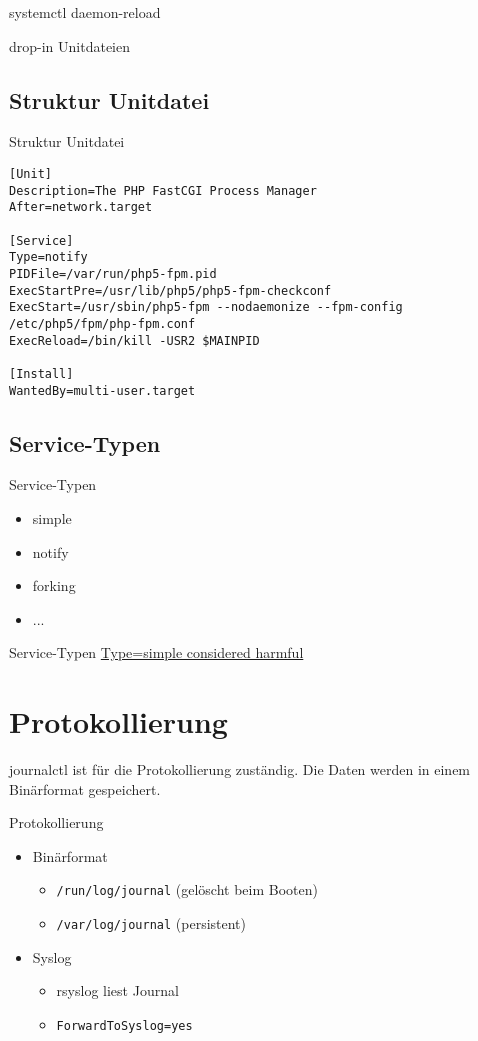  systemctl daemon-reload

 drop-in Unitdateien
 \subsection{Struktur Unitdatei}

\begin{frame}[fragile]{Struktur Unitdatei}
 \begin{lstlisting}
[Unit]
Description=The PHP FastCGI Process Manager
After=network.target

[Service]
Type=notify
PIDFile=/var/run/php5-fpm.pid
ExecStartPre=/usr/lib/php5/php5-fpm-checkconf
ExecStart=/usr/sbin/php5-fpm --nodaemonize --fpm-config /etc/php5/fpm/php-fpm.conf
ExecReload=/bin/kill -USR2 $MAINPID

[Install]
WantedBy=multi-user.target
\end{lstlisting}
\end{frame}

\subsection{Service-Typen}

\begin{frame}{Service-Typen}
\begin{itemize}
\item simple
\item notify
\item forking
\item ...
\end{itemize}
\end{frame}

\begin{frame}{Service-Typen}
\href{https://www.lucas-nussbaum.net/blog/?p=877}{Type=simple considered harmful}
\end{frame}

\section{Protokollierung}

journalctl ist für die Protokollierung zuständig. Die Daten werden in einem Binärformat gespeichert.

\begin{frame}[fragile]{Protokollierung}
\begin{itemize}
\item Binärformat
\begin{itemize}
\item \verb|/run/log/journal| (gelöscht beim Booten)
\item \verb|/var/log/journal| (persistent)
\end{itemize}
\item Syslog
	\begin{itemize}
	\item rsyslog liest Journal
	\item \verb|ForwardToSyslog=yes|
	\end{itemize}
\end{itemize}
\end{frame}

